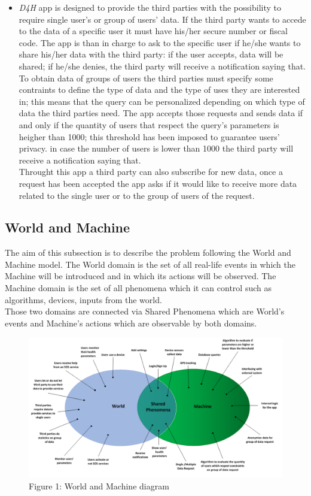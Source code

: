 \begin{itemize}
	\item{\textit{D4H} app is designed to provide the third parties with the possibility to require single user's or group of users' data.
		If the third party wants to accede to the data of  a specific user it must have his/her secure number or fiscal code. The app is than in charge to ask to the specific user if he/she wants to share his/her data with the third party: if the user accepts, data will be shared; if he/she denies, the third party will receive a notification saying that.\\
		To obtain data of groups of users the third parties must specify some contraints to define the type of data and the type of uses they are interested in; this means that the query can be personalized depending on which type of data the third parties need. The app accepts those requests and sends data if and only if the quantity of users that respect the query's parameters is heigher than 1000; this threshold has been imposed to guarantee users' privacy. in case the number of users is lower than 1000 the third party will receive a notification saying that.\\
		Throught this app a third party can also subscribe for new data, once a request has been accepted the app asks if it would like to receive more data related to the single user or to the group of users of the request.}
		
\end{itemize}

\subsection{World and Machine}
The aim of this subsection is to describe the problem following the World and Machine model. The World domain is the set of all real-life events in which the Machine will be introduced and in which its actions will be observed. The Machine domain is the set of all phenomena which it can control such as algorithms, devices, inputs from the world.\\
Those two domains are connected via Shared Phenomena which are World's events and Machine's actions which are observable by both domains.

\begin{figure}[h!]
	\includegraphics[width=1.00\textwidth]{./pictures/world_machine.png}\par
	\caption{Figure 1: World and Machine diagram}
\end{figure}